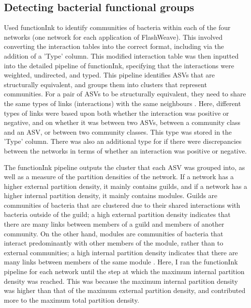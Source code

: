 \documentclass[11pt]{article}
\begin{document}
\subsection{Detecting bacterial functional groups}
Used functionInk to identify communities of bacteria within each of the four networks (one network for each application of FlashWeave). This involved converting the interaction tables into the correct format, including via the addition of a 'Type' column. This modified interaction table was then inputted into the detailed pipeline of functionInk, specifying that the interactions were weighted, undirected, and typed. This pipeline identifies ASVs that are structurally equivalent, and groups them into clusters that represent communities. For a pair of ASVs to be structurally equivalent, they need to share the same types of links (interactions) with the same neighbours \citep{functionink}. Here, different types of links were based upon both whether the interaction was positive or negative, and on whether it was between two ASVs, between a community class and an ASV, or between two community classes. This type was stored in the 'Type' column. There was also an additional type for if there were discrepancies between the networks in terms of whether an interaction was positive or negative.

The functionInk pipeline outputs the cluster that each ASV was grouped into, as well as a measure of the partition densities of the network. If a network has a higher external partition density, it mainly contains guilds, and if a network has a higher internal partition density, it mainly contains modules. Guilds are communities of bacteria that are clustered due to their shared interactions with bacteria outside of the guild; a high external partition density indicates that there are many links between members of a guild and members of another community. On the other hand, modules are communities of bacteria that interact predominantly with other members of the module, rather than to external communities; a high internal partition density indicates that there are many links between members of the same module \citep{functionink}. Here, I ran the functionInk pipeline for each network until the step at which the maximum internal partition density was reached. This was because the maximum internal partition density was higher than that of the maximum external partition density, and contributed more to the maximum total partition density.
\end{document}

